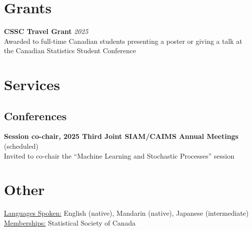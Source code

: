 \documentclass[11pt]{article}
\theoremstyle{definition}
\newcommand{\1}{\mathds 1}
\begin{document}
\section*{Grants}
\textbf{CSSC Travel Grant} \hfill \textit{2025}\\
Awarded to full-time Canadian students presenting a poster or giving a talk at the Canadian Statistics Student Conference

\section*{Services}
\subsection*{Conferences}
\textbf{Session co-chair, 2025 Third Joint SIAM/CAIMS Annual Meetings} (scheduled) \\
Invited to co-chair the ``Machine Learning and Stochastic Processes'' session 


\section*{Other}
\underline{Languages Spoken:} English (native), Mandarin (native), Japanese (intermediate)\\
\underline{Memberships:} Statistical Society of Canada
\end{document}
